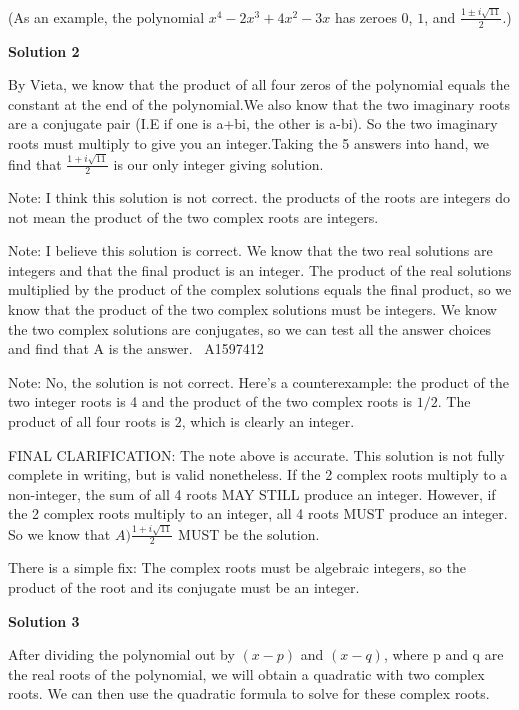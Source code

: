 \begin{enumerate}
 (As an example, the polynomial $x^4 - 2x^3 + 4x^2 - 3x$ has zeroes $0$, $1$, and $\frac {1 \pm i \sqrt {11}}{2}$.)

 



\textbf{Solution 2}

By Vieta, we know that the product of all four zeros of the polynomial equals the constant at the end of the polynomial.We also know that the two imaginary roots are a conjugate pair (I.E if one is a+bi, the other is a-bi). So the two imaginary roots must multiply to give you an integer.Taking the 5 answers into hand, we find that $\boxed{\frac {1 + i \sqrt {11}}{2}}$ is our only integer giving solution.

 Note: I think this solution is not correct. the products of the roots are integers do not mean the product of the two complex roots are integers.

 Note: I believe this solution is correct. We know that the two real solutions are integers and that the final product is an integer. The product of the real solutions multiplied by the product of the complex solutions equals the final product, so we know that the product of the two complex solutions must be integers. We know the two complex solutions are conjugates, so we can test all the answer choices and find that A is the answer. ~A1597412

 Note: No, the solution is not correct. Here's a counterexample: the product of the two integer roots is 4 and the product of the two complex roots is $1/2$. The product of all four roots is $2$, which is clearly an integer.

 FINAL CLARIFICATION: The note above is accurate. This solution is not fully complete in writing, but is valid nonetheless. If the 2 complex roots multiply to a non-integer, the sum of all 4 roots MAY STILL produce an integer. However, if the 2 complex roots multiply to an integer, all 4 roots MUST produce an integer. So we know that $\boxed{ A) \frac {1 + i \sqrt {11}}{2}}$ MUST be the solution.

 There is a simple fix: The complex roots must be algebraic integers, so the product of the root and its conjugate must be an integer.

 



\textbf{Solution 3}

After dividing the polynomial out by $(x-p)$ and $(x-q)$, where p and q are the real roots of the polynomial, we will obtain a quadratic with two complex roots. We can then use the quadratic formula to solve for these complex roots.


\end{enumerate}
